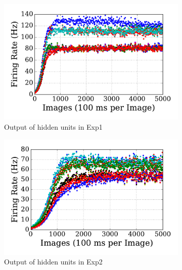 \begin{figure}
\DIFdelendFL \DIFaddbeginFL \begin{subfigure}[t]{0.48\textwidth}
		\DIFaddendFL \includegraphics[width=\textwidth]{pics_sdlm/00_exp_SAE_Orig/exp1_hid_s.pdf}
		\caption{Output of hidden units in Exp1}
	\end{subfigure}
	\DIFdelbeginFL %
\DIFdelendFL \DIFaddbeginFL \begin{subfigure}[t]{0.48\textwidth}
		\DIFaddendFL \includegraphics[width=\textwidth]{pics_sdlm/00_exp_SAE_Orig/exp2_hid_s.pdf}
		\caption{Output of hidden units in Exp2}
	\end{subfigure}\\
	\DIFdelbeginFL %
\DIFdelendFL \DIFaddbeginFL \begin{subfigure}[t]{0.48\textwidth}

\end{subfigure}
\end{figure}
